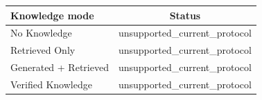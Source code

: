 \begin{tabular}{lc}
\toprule
Knowledge mode & Status \\ 
\midrule
No Knowledge & unsupported\_current\_protocol \\
Retrieved Only & unsupported\_current\_protocol \\
Generated + Retrieved & unsupported\_current\_protocol \\
Verified Knowledge & unsupported\_current\_protocol \\
\bottomrule
\end{tabular}
